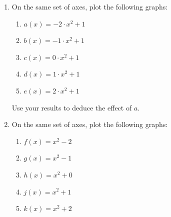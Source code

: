     \addtocounter{footnote}{-0}
    
\label{m39345*secfhsst!!!underscore!!!id1384}
            \nopagebreak
            
        \label{m39345*id240398}\begin{enumerate}[noitemsep, label=\textbf{\arabic*}. ] 
            \label{m39345*uid103}\item On the same set of axes, plot the following graphs:
\label{m39345*id240413}\begin{enumerate}[noitemsep, label=\textbf{\alph*}. ] 
            \label{m39345*uid104}\item \begin{math}a\left(x\right)=-2\ensuremath{\cdot}{x}^{2}+1\end{math}\label{m39345*uid105}\item \begin{math}b\left(x\right)=-1\ensuremath{\cdot}{x}^{2}+1\end{math}\label{m39345*uid106}\item \begin{math}c\left(x\right)=0\ensuremath{\cdot}{x}^{2}+1\end{math}\label{m39345*uid107}\item \begin{math}d\left(x\right)=1\ensuremath{\cdot}{x}^{2}+1\end{math}\label{m39345*uid108}\item \begin{math}e\left(x\right)=2\ensuremath{\cdot}{x}^{2}+1\end{math}\end{enumerate}
        
Use your results to deduce the effect of \begin{math}a\end{math}.
\label{m39345*uid109}\item On the same set of axes, plot the following graphs:
\label{m39345*id240675}\begin{enumerate}[noitemsep, label=\textbf{\alph*}. ] 
            \label{m39345*uid110}\item \begin{math}f\left(x\right)={x}^{2}-2\end{math}\label{m39345*uid111}\item \begin{math}g\left(x\right)={x}^{2}-1\end{math}\label{m39345*uid112}\item \begin{math}h\left(x\right)={x}^{2}+0\end{math}\label{m39345*uid113}\item \begin{math}j\left(x\right)={x}^{2}+1\end{math}\label{m39345*uid114}\item \begin{math}k\left(x\right)={x}^{2}+2\end{math}\end{enumerate}
        

\end{enumerate}
